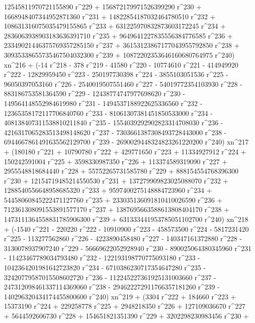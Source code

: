        12545811970721155890 r^229 + 156872179971526399290 r^230 + 
       1668948407344952871360 r^231 + 14822854187032464780510 r^232 + 
       108631316075035479155865 r^233 + 
       631225970832873603172245 r^234 + 
       2836063938903183636391710 r^235 + 
       9649641227835556384776585 r^236 + 
       23349021446375769357285150 r^237 + 
       36153123867177043955792850 r^238 + 
       30935338655735467504032300 r^239 + 
       10872202353646160680764975 r^240) xn^216 + (-14 r^218 - 
       378 r^219 - 41580 r^220 - 10774610 r^221 - 414949920 r^222 - 
       12829959450 r^223 - 250197730398 r^224 - 3855103051536 r^225 - 
       96050397053160 r^226 - 2540019507551460 r^227 - 
       54019772354103930 r^228 - 883186753581364590 r^229 - 
       12438774747977698620 r^230 - 149564148552984619980 r^231 - 
       1494537188922625336560 r^232 - 12365358172117706840760 r^233 - 
       81061307381451850533000 r^234 - 
       408138407311538810211840 r^235 - 
       1554039292902823314708030 r^236 - 
       4216317065283513498148620 r^237 - 
       7303661387308493728443000 r^238 - 
       6944667861491635562129700 r^239 - 
       2690029448324823261220200 r^240) xn^217 + (180180 r^221 + 
       10790780 r^222 + 429771650 r^223 + 11334927912 r^224 + 
       150242591004 r^225 + 3598330987350 r^226 + 
       113374589319090 r^227 + 2955548818684440 r^228 + 
       55752265731585780 r^229 + 888154554768396300 r^230 + 
       12154719485214550530 r^231 + 137279909823025088070 r^232 + 
       1288540556648958685320 r^233 + 9597400275148884723960 r^234 + 
       54458060845222471127760 r^235 + 
       233035136091810410026590 r^236 + 
       712361308091553891577170 r^237 + 
       1387695663588613808404170 r^238 + 
       1473111364558831785906300 r^239 + 
       631333441953785051102700 r^240) xn^218 + (-1540 r^221 - 
       220220 r^222 - 10910900 r^223 - 458573500 r^224 - 
       5817231420 r^225 - 113277562860 r^226 - 4223890458480 r^227 - 
       140347161372880 r^228 - 3130078937907240 r^229 - 
       56669622052928940 r^230 - 890025064380345960 r^231 - 
       11423467789034793480 r^232 - 122193198770775093180 r^233 - 
       1042364201981642723820 r^234 - 6710386230717354647280 r^235 - 
       32420779587015508602720 r^236 - 
       112245227361925131003660 r^237 - 
       247312098461337114369060 r^238 - 
       294622272911766357181260 r^239 - 
       140296320434174455800600 r^240) xn^219 + (3304 r^222 + 
       184660 r^223 + 15373190 r^224 + 229258778 r^225 + 
       2948218350 r^226 + 127109036670 r^227 + 5644592606730 r^228 + 
       154651821351390 r^229 + 3202298230983456 r^230 + 
